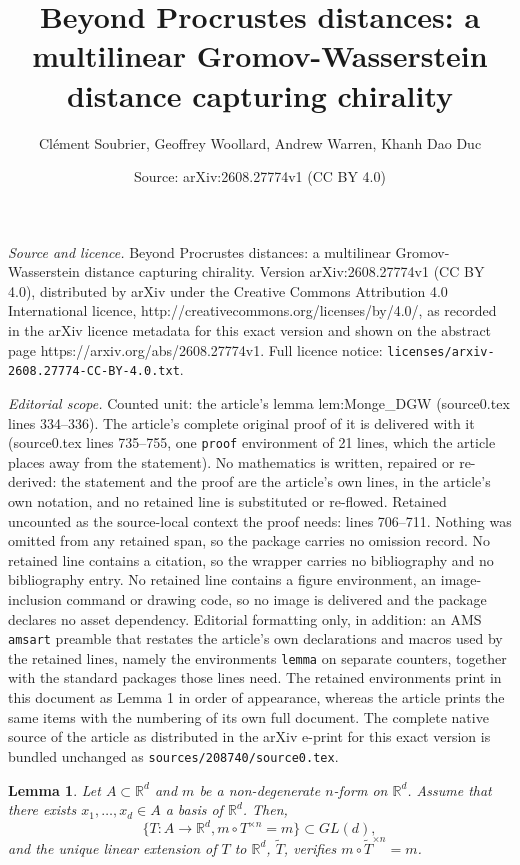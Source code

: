 \documentclass[10pt,a4paper]{amsart}
\title{Beyond Procrustes distances: a multilinear Gromov-Wasserstein distance capturing chirality}
\author{Cl\'ement Soubrier, Geoffrey Woollard, Andrew Warren, Khanh Dao Duc}
\date{Source: arXiv:2608.27774v1 (CC BY 4.0)}
\newtheorem{lemma}{Lemma}
\newcommand{\R}{\mathbb{R}}
\begin{document}
\maketitle

\noindent\emph{Source and licence.} Beyond Procrustes distances: a multilinear Gromov-Wasserstein distance capturing chirality. Version arXiv:2608.27774v1 (CC BY 4.0), distributed by arXiv under the Creative Commons Attribution 4.0 International licence, http://creativecommons.org/licenses/by/4.0/, as recorded in the arXiv licence metadata for this exact version and shown on the abstract page https://arxiv.org/abs/2608.27774v1. Full licence notice: \texttt{licenses/arxiv-2608.27774-CC-BY-4.0.txt}.\par\smallskip

\noindent\textit{Editorial scope.} Counted unit: the article's lemma lem:Monge\_DGW (source0.tex lines 334--336). The article's complete original proof of it is delivered with it (source0.tex lines 735--755, one \texttt{proof} environment of 21 lines, which the article places away from the statement). No mathematics is written, repaired or re-derived: the statement and the proof are the article's own lines, in the article's own notation, and no retained line is substituted or re-flowed.  Retained uncounted as the source-local context the proof needs: lines 706--711.  Nothing was omitted from any retained span, so the package carries no omission record.  No retained line contains a citation, so the wrapper carries no bibliography and no bibliography entry.  No retained line contains a figure environment, an image-inclusion command or drawing code, so no image is delivered and the package declares no asset dependency.  Editorial formatting only, in addition: an AMS \texttt{amsart} preamble that restates the article's own declarations and macros used by the retained lines, namely the environments \texttt{lemma} on separate counters, together with the standard packages those lines need.  The retained environments print in this document as Lemma 1 in order of appearance, whereas the article prints the same items with the numbering of its own full document.  The complete native source of the article as distributed in the arXiv e-print for this exact version is bundled unchanged as \texttt{sources/208740/source0.tex}.
\begin{lemma}\label{lem:non_dege_small_set}
    Let $A\subset\R^d$ and $m$ be a non-degenerate $n$-form on $\R^d$. Assume that there exists $x_1,\dots,x_d\in A$ a basis of $\R^d$. Then, 
    \[\{T: A\to\R^d, m\circ T^{\times n}=m\}\subset GL(d),\] 
    and the unique linear extension of $T$ to $\R^d$, $\tilde{T}$, verifies $m\circ \tilde{T}^{\times n}=m$.
    
\end{lemma}
\end{document}
